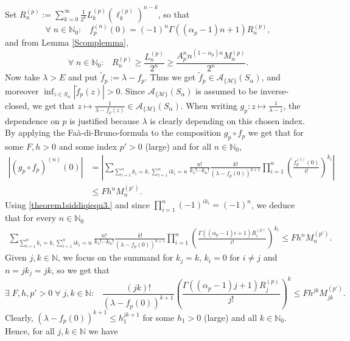 \documentclass[11pt,a4paper]{article}
\theoremstyle{plain}
\theoremstyle{definition}
\newcommand{\NN}{\mathbb{N}}
\begin{document}
Set $R^{(p)}_n:=\sum_{k= 0}^\infty\frac{1}{2^k}L^{(p)}_k(\ell^{(p)}_{k})^{n-k}$, so that
\begin{equation}\label{theorem1siddiqiequ3.}
	\forall\;n\in\NN_0:\;\;\;f^{(n)}_{p}(0)=(-1)^n  \Gamma((\alpha_p-1)n+1)R_n^{(p)},
\end{equation}
and from Lemma \ref{Scomplemma},
\begin{equation}\label{theorem1siddiqiequ4.}
	 \forall\;n\in\NN_0:\;\;\;R^{(p)}_n\geq\frac{L^{(p)}_n}{2^n}\ge \frac{A_p^nn^{(1-\alpha_p)n}M^{(p)}_n}{2^n}.
\end{equation}
%
Now take $\lambda>E$ and put $\widetilde{f}_{p}:=\lambda-f_{p}$. Thus we get $\widetilde{f}_{p}\in\mathcal{A}_{\{\mathcal{M}\}}(S_{\alpha})$, and moreover $\inf_{z\in S_\alpha}|\widetilde{f}_{p}(z)|>0$. Since $\mathcal{A}_{\{\mathcal{M}\}}(S_{\alpha})$ is assumed to be inverse-closed, we get that $z\mapsto%
\frac{1}{\lambda-f_{p}(z)}\in\mathcal{A}_{\{\mathcal{M}\}}(S_{\alpha})$. When writing $g_{p} :z\mapsto\frac{1}{\lambda-z}$, the dependence on $p$ is justified because $\lambda$ is clearly depending on this chosen index. By applying the Fa\`a-di-Bruno-formula to the composition $g_{p} \circ f_{p}$ we get that for some $F,h>0$ and some index $p'>0$ (large) and for all $n\in\NN_0$,
\begin{align*}
	|(g_{p} \circ f_{p})^{(n)}(0)|&=\left|\sum_{\sum_{i=1}^nk_i=k, \sum_{i=1}^nik_i=n}\frac{n!}{k_1!\cdots k_n!} \frac{k!}{(\lambda-f_{p}(0))^{k+1}} \prod_{i=1}^n\left(\frac{f_p^{(i)}(0)}{i!}\right)^{k_i}\right|\\
&\le Fh^nM^{(p')}_n.
\end{align*}
Using \eqref{theorem1siddiqiequ3.}
and since $ \prod_{i=1}^n (-1)^{ik_i}=(-1)^n $, we deduce that for every $n\in\NN_0$
\begin{align*}
\sum_{\sum_{i=1}^nk_i=k, \sum_{i=1}^nik_i=n} \frac{n!}{k_1!\cdots k_n!} \frac{k!}{(\lambda-f_{p}(0))^{k+1}} \prod_{i=1}^n\left(\frac{\Gamma((\alpha_p-1)i+1)R_i^{(p)}}{i!}\right)^{k_i}
\le Fh^nM^{(p')}_n.
\end{align*}
Given $j,k\in\NN$, we focus on the summand for $k_j=k$, $k_i=0$ for $i\neq j$ and $n=jk_j=jk$, so we get that
$$\exists\;F,h,p'>0\;\forall\;j,k\in\NN:\;\;\;\frac{(jk)!}{(\lambda-f_{p}(0))^{k+1}} \left(\frac{\Gamma((\alpha_p-1)j+1)R_j^{(p)}}{j!}\right)^{k}\le Fh^{jk}M^{(p')}_{jk}.
$$
Clearly, $(\lambda-f_{p}(0))^{k+1}\le h_1^{jk+1}$ for some $h_1>0$ (large) and all $k\in\NN_0$. Hence, for all $j,k\in\NN$ we have
\end{document}

